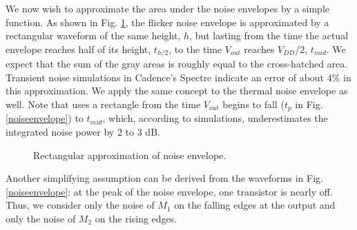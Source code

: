 We now wish to approximate the area under the noise envelopes by a simple function. As shown in Fig. \ref{deltat}, the flicker noise envelope is
approximated by a rectangular waveform of the same height, $h$, but lasting from the time the actual envelope reaches half of its height,
$t_{h/2}$, to the time $V_{out}$ reaches $V_{DD}$/$2$, $t_{mid}$.
We expect that the sum of the gray areas is roughly equal to the cross-hatched area. Transient noise simulations in Cadence's Spectre indicate an
error of about 4\% in this approximation. We apply the same concept to the thermal noise envelope as well. Note that \cite{Abidi} uses a
rectangle from the time $V_{out}$ begins to fall ($t_p$ in Fig. \ref{noiseenvelope}) to $t_{mid}$, which, according to simulations, underestimates
the integrated noise power by 2 to 3 dB.
\begin{figure}[htb]
\vspace{1.7in}
\caption{Rectangular approximation of noise envelope.}
\label{deltat}
\end{figure}

Another simplifying assumption can be derived from the waveforms in Fig. \ref{noiseenvelope}: at the peak of the noise
envelope, one transistor is nearly off. Thus, we consider only the noise of $M_1$ on the falling edges at the output and only the noise of $M_2$ on
the rising edges.

